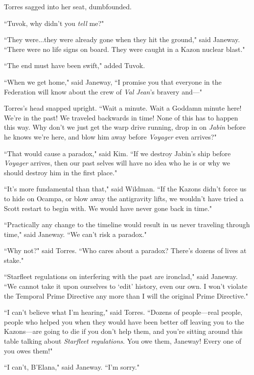 \documentclass[twoside,letterpaper,12pt]{memoir}
\begin{document}
Torres sagged into her seat, dumbfounded. 

``Tuvok, why didn't you \textit{tell} me?" 

``They were...they were already gone when they hit the ground," said Janeway. ``There were no life signs on board. They were caught in a Kazon nuclear blast." 

``The end must have been swift," added Tuvok. 

``When we get home," said Janeway, ``I promise you that everyone in the Federation will know about the crew of \textit{Val Jean}'s bravery and---" 

Torres's head snapped upright. ``Wait a minute. Wait a Goddamn minute here! We're in the past! We traveled backwards in time! None of this has to happen this way. Why don't we just get the warp drive running, drop in on \textit{Jabin} before he knows we're here, and blow him away before \textit{Voyager} even arrives?" 

``That would cause a paradox," said Kim. ``If we destroy Jabin's ship before \textit{Voyager} arrives, then our past selves will have no idea who he is or why we should destroy him in the first place." 

``It's more fundamental than that," said Wildman. ``If the Kazons didn't force us to hide on Ocampa, or blow away the antigravity lifts, we wouldn't have tried a Scott restart to begin with. We would have never gone back in time." 

``Practically any change to the timeline would result in us never traveling through time," said Janeway. ``We can't risk a paradox." 

``Why not?" said Torres. ``Who cares about a paradox? There's dozens of lives at stake." 

``Starfleet regulations on interfering with the past are ironclad," said Janeway. ``We cannot take it upon ourselves to `edit' history, even our own. I won't violate the Temporal Prime Directive any more than I will the original Prime Directive." 

``I can't believe what I'm hearing," said Torres. ``Dozens of people---real people, people who helped you when they would have been better off leaving you to the Kazons---are going to die if you don't help them, and you're sitting around this table talking about \textit{Starfleet regulations}. You owe them, Janeway! Every one of you owes them!" 

``I can't, B'Elana," said Janeway. ``I'm sorry." 
\end{document}
